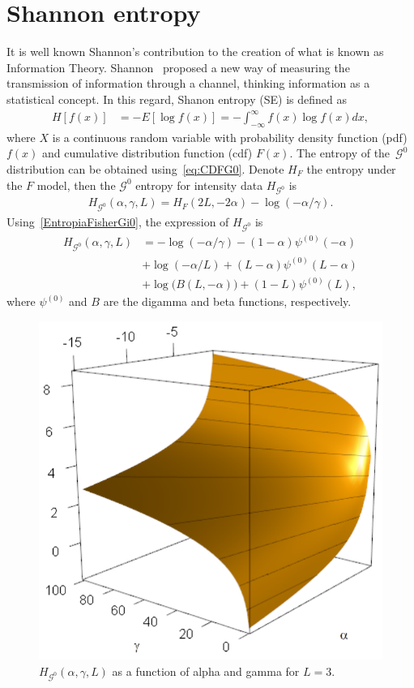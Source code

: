 \documentclass[journal]{IEEEtran}
\begin{document}
	\section{Shannon entropy}
	
	It is well known Shannon's contribution to the creation of what is known as Information Theory. 
	Shannon~\cite{Shannon1948} proposed a new way of
	measuring the transmission of information through a channel, thinking information as a statistical concept. 
	In this regard, Shanon entropy (SE) is defined as
	\begin{align}
		\label{SE}
		H[f(x)]&=-E[\log f(x)]=-\int_{-\infty}^{\infty} f(x) \log f(x) d x,
	\end{align}
	where $X$ is a continuous random variable with probability density function (pdf) $f(x)$ and
	cumulative distribution function (cdf) $F(x)$. 
	The entropy of the~$\mathcal{G}^0$ distribution can be obtained using~\eqref{eq:CDFG0}.
	Denote $H_{F}$ the entropy under the $F$ model, then the $\mathcal{G}^0$ entropy for intensity data $H_{\mathcal G^0}$ is 
	\begin{align}
		\label{EntropiaFisherGi0}
		H_{\mathcal G^0}(\alpha,\gamma,L)=H_{F}(2 L, - 2 \alpha) -\log(-\alpha / \gamma).
	\end{align}
	Using~\eqref{EntropiaFisherGi0}, the
	expression of $H_{\mathcal G^0}$ is
	\begin{align}
		\label{EG0}
		H_{\mathcal G^0}(\alpha,\gamma,L)&=-\log (-\alpha / \gamma)-(1-\alpha ) \psi^{(0)}(-\alpha )\\ \nonumber
		&+\log (-\alpha / L)+ ( L- \alpha ) \psi ^{(0)} ( L- \alpha )\\ \nonumber
		&+\log \big(B(L,-\alpha )\big)+(1-L) \psi^{(0)}(L),
	\end{align}
	where $\psi^{(0)}$ and $B$ are the digamma and beta functions, respectively.
	\begin{figure}[hbt]
		\centering    
		\includegraphics[width=0.6\linewidth]{../../../Figures/CISS2021/HG0L=3_2_2.pdf}
		\caption{$H_{\mathcal G^0}(\alpha,\gamma,L)$ as a function of alpha and gamma for $L=3$.\label{figure:HG0}}
	\end{figure}
	
\end{document}
